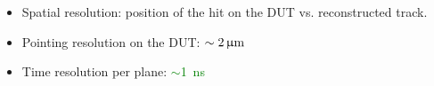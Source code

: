 \begin{frame}
\begin{columns}
    \begin{itemize}
    \item Spatial resolution: position of the hit on the DUT
      vs. reconstructed track.
    \item Pointing resolution on the DUT:
      \textcolor{Green}{$\sim2\,\upmu\mathrm{m}$}
    \item Time resolution per plane: \textcolor{Green}{$\sim$1~ns}
    \end{itemize}


        

  \end{columns}

\end{frame}


